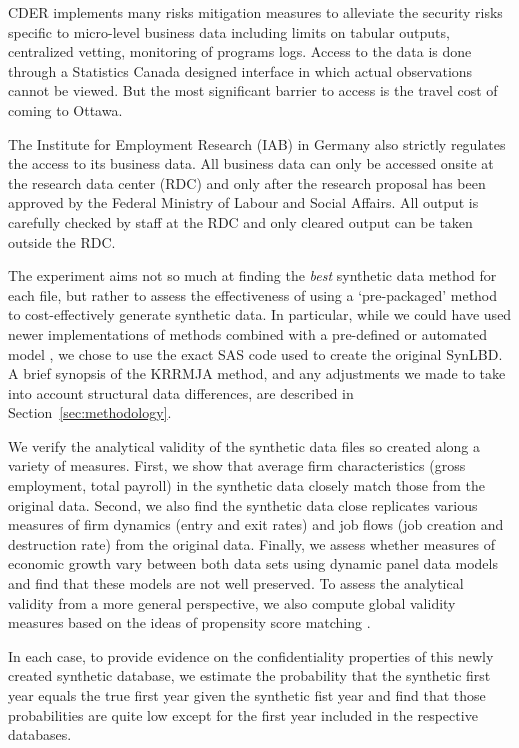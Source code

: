 CDER implements many risks mitigation measures to alleviate the security risks specific to micro-level business data including limits on tabular outputs, centralized vetting, monitoring of programs logs. Access to the data is done through a Statistics Canada designed interface in which actual observations cannot be viewed. But the most significant barrier to access is the travel cost of coming to Ottawa.

The Institute for Employment Research (IAB) in Germany also strictly regulates the access to its business data. All business data can only be accessed onsite at the research data center (RDC) and only after the research proposal has been approved by the Federal Ministry of Labour and Social Affairs. All output is carefully checked by staff at the RDC and only cleared output can be taken outside the RDC. 

The experiment aims not so much at finding the \textit{best} synthetic data method for each file, but rather to assess the effectiveness of using a `pre-packaged' method to cost-effectively generate synthetic data. In particular, while we could have used newer implementations of methods combined with a pre-defined or automated model \citep{JSSv074i11,Raab_Nowok_Dibben_2018}, we chose to use the exact SAS code used to create the original \ac{SynLBD}. A brief synopsis of the KRRMJA method, and any adjustments we made to take into account structural data differences, are described in Section~\ref{sec:methodology}.

We verify the analytical validity of the synthetic data files so created along a variety of measures. First, we show that average firm characteristics (gross employment, total payroll) in the synthetic data closely match those from the original data. Second, we also find the synthetic data close replicates various measures of firm dynamics (entry and exit rates) and job flows (job creation and destruction rate) from the original data. Finally, we assess whether measures of economic growth vary between both data sets using dynamic panel data models and find that these models are not well preserved. To assess the analytical validity from a more general perspective, we also compute global validity measures based on the ideas of propensity score matching \citet{Woo_Reiter_Oganian_Karr_2009,Snoke_RSSA2018}.

In each case, to provide evidence on the confidentiality properties of this newly created synthetic database, we estimate the probability that the synthetic first year equals the true first year given the synthetic fist year and find that those probabilities are quite low except for the first year included in the respective databases. 

